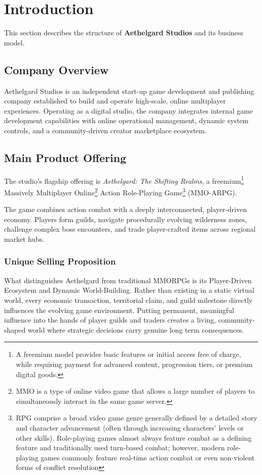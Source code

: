 
\section{Introduction} \label{sec:intro}

This section describes the structure of \textbf{Aethelgard Studios} and its business model.

\subsection{Company Overview}
Aethelgard Studios is an independent start-up game development and publishing company established to build and operate high-scale,
online multiplayer experiences.
Operating as a digital studio, the company integrates internal game development capabilities with online operational management,
dynamic system controls, and a community-driven creator marketplace ecosystem.

\subsection{Main Product Offering}
The studio's flagship offering is \textit{Aethelgard: The Shifting Realms}, a freemium\footnote{A freemium model provides basic
features or initial access free of charge, while requiring payment for advanced content, progression tiers, or premium digital
goods.} Massively Multiplayer Online\footnote{MMO is a type of online video game that allows a large number of players to
simultaneously interact in the same game server.} Action Role-Playing Game\footnote{RPG comprise a broad video game genre generally
defined by a detailed story and character advancement (often through increasing characters' levels or other skills). Role-playing
games almost always feature combat as a defining feature and traditionally used turn-based combat; however, modern role-playing
games commonly feature real-time action combat or even non-violent forms of conflict resolution} (MMO-ARPG).

The game combines action combat with a deeply interconnected, player-driven economy.
Players form guilds, navigate procedurally evolving wilderness zones, challenge complex boss encounters, and trade player-crafted
items across regional market hubs.

\subsubsection{Unique Selling Proposition}
What distinguishes Aethelgard from traditional MMORPGs is its Player-Driven Ecosystem and Dynamic World-Building.
Rather than existing in a static virtual world, every economic transaction, territorial claim, and guild milestone directly
influences the evolving game environment.
Putting permanent, meaningful influence into the hands of player guilds and traders creates a living, community-shaped world where
strategic decisions carry genuine long term consequences.

